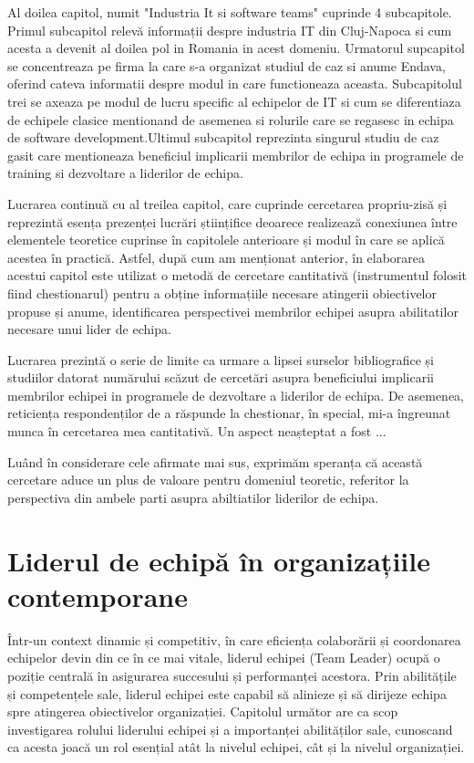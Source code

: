 \documentclass[a4paper, 12pt]{article}
\begin{document}
	\quad Al doilea capitol, numit "Industria It si software teams" cuprinde 4 subcapitole. Primul subcapitol relevă informații despre industria IT din Cluj-Napoca si cum acesta a devenit al doilea pol in Romania in acest domeniu. Urmatorul supcapitol se concentreaza pe firma la care s-a organizat studiul de caz si anume Endava, oferind cateva informatii despre modul in care functioneaza aceasta. Subcapitolul trei se axeaza pe modul de lucru specific al echipelor de IT si cum se diferentiaza de echipele clasice mentionand de asemenea si rolurile care se regasesc in echipa de software development.Ultimul subcapitol reprezinta singurul studiu de caz gasit care mentioneaza beneficiul implicarii membrilor de echipa in programele de training si dezvoltare a liderilor de echipa.

	\quad Lucrarea continuă cu al treilea capitol, care cuprinde cercetarea propriu-zisă și reprezintă esența prezenței lucrări științifice deoarece realizează conexiunea între elementele teoretice cuprinse în capitolele anterioare și modul în care se aplică acestea în practică. Astfel, după cum am menționat anterior, în elaborarea acestui capitol este utilizat o metodă de cercetare cantitativă (instrumentul folosit fiind chestionarul) pentru a obține informațiile necesare atingerii obiectivelor propuse și anume, identificarea perspectivei membrilor echipei asupra abilitatilor necesare unui lider de echipa.

	\quad Lucrarea prezintă o serie de limite ca urmare a lipsei surselor bibliografice și studiilor datorat numărului scăzut  de cercetări asupra beneficiului implicarii membrilor echipei in programele de dezvoltare a liderilor de echipa. De asemenea, reticiența respondenților de a răspunde la chestionar, în special, mi-a îngreunat munca în cercetarea mea cantitativă. Un aspect neașteptat a fost ...

	\quad Luând în considerare cele afirmate mai sus, exprimăm speranța că această cercetare aduce un plus de valoare pentru domeniul teoretic, referitor la perspectiva din ambele parti asupra abiltiatilor liderilor de echipa.


\newpage
	\setcounter{section}{0}
	\section{Liderul de echipă în organizațiile contemporane}
\quad \quad\space Într-un context dinamic și competitiv, în care eficiența colaborării și coordonarea echipelor devin din ce în ce mai vitale, liderul echipei (Team Leader) ocupă o poziție centrală în asigurarea succesului și performanței acestora. Prin abilitățile și competențele sale, liderul echipei este capabil să alinieze și să dirijeze echipa spre atingerea obiectivelor organizației. Capitolul următor are ca scop investigarea rolului liderului echipei și a importanței abilităților sale, cunoscand ca acesta joacă un rol esențial atât la nivelul echipei, cât și la nivelul organizației.
\end{document}
